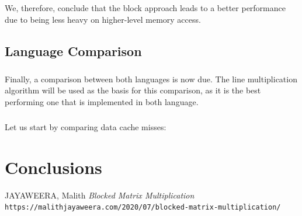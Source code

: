 \documentclass{report}
\begin{document}
				\paragraph{}We, therefore, conclude that the block approach leads to a better performance due to being less heavy on higher-level memory access.
			
		\section{Language Comparison}
		
		\paragraph{}Finally, a comparison between both languages is now due. The line multiplication algorithm will be used as the basis for this comparison, as it is the best performing one that is implemented in both language. 
		
		\paragraph{}Let us start by comparing data cache misses: 
	
	\chapter{Conclusions}
	
	\begin{thebibliography}{1}
		JAYAWEERA, Malith \textit{Blocked Matrix Multiplication}
		\\\texttt{https://malithjayaweera.com/2020/07/blocked-matrix-multiplication/}
	\end{thebibliography}
	
\end{document}
